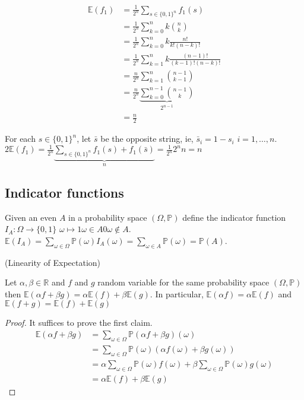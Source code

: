 \documentclass{article}
\begin{document}
\begin{align*}
\mathbb{E}(f_1) &= \frac{1}{2^n} \sum_{s \in \{0,1\}^n} f_1(s) \\
 &= \frac{1}{2^n} \sum_{k=0}^n k {n \choose k}\\
& = \frac{1}{2^n} \sum_{k=0}^n k \frac{n!}{k! (n-k)!} \\
& = \frac{1}{2^n} \sum_{k=1}^n k \frac{(n-1)!}{(k-1)! (n-k)!}\\
& = \frac{n}{2^n} \sum_{k=1}^n {{n-1} \choose {k-1}} \\
& = \frac{n}{2^n} \underbrace{\sum_{k=0}^{n-1} {{n-1} \choose {k}}}_{2^{n-1}} \\
& = \frac{n}{2}
\end{align*}

For each $s \in \{0,1\}^n$, let $\bar{s}$ be the opposite string, ie, $\bar{s}_i = 1 - s_i$ $i = 1, \ldots, n$.  $2 \mathbb{E}(f_1) = \frac{1}{2^n} \underbrace{\sum_{s \in \{0,1\}^n} f_1 (s) + f_1 (\bar{s})}_{n} = \frac{1}{2^n} 2^n n= n$

\subsection*{Indicator functions}
Given an even $A$ in a probability space $(\Omega, \mathbb{P})$ define the indicator function $I_A : \Omega \rightarrow \{0,1\}$ $\omega \mapsto { 1 \omega \in A 0 \omega \notin A}$.  $\mathbb{E}(I_A) = \sum_{\omega \in \Omega} \mathbb{P}(\omega) I_A( \omega) = \sum_{\omega \in A} \mathbb{P}(\omega) = \mathbb{P}(A)$.

\begin{prop}
(Linearity of Expectation)

Let $\alpha, \beta \in \mathbb{R}$ and $f$ and $g$ random variable for the same probability space $(\Omega, \mathbb{P})$ then $\mathbb{E}(\alpha f + \beta g) = \alpha \mathbb{E}(f) + \beta \mathbb{E} (g)$.  In particular, $\mathbb{E}(\alpha f) = \alpha \mathbb{E} (f)$ and $\mathbb{E}(f+g) = \mathbb{E}(f) + \mathbb{E}(g)$
\end{prop}

\begin{proof}
It suffices to prove the first claim.
\begin{align*}
\mathbb{E}(\alpha f + \beta g) & = \sum_{\omega \in \Omega} \mathbb{P}(\alpha f + \beta g)(\omega) \\
&= \sum_{\omega \in \Omega} \mathbb{P}(\omega)(\alpha f(\omega) + \beta g(\omega)) \\
& = \alpha \sum_{\omega \in \Omega} \mathbb{P}(\omega)f(\omega) + \beta \sum_{\omega \in \Omega} \mathbb{P}(\omega) g(\omega) \\
&= \alpha \mathbb{E}(f) + \beta \mathbb{E} (g) 
\end{align*}
\end{proof}
\end{document}
